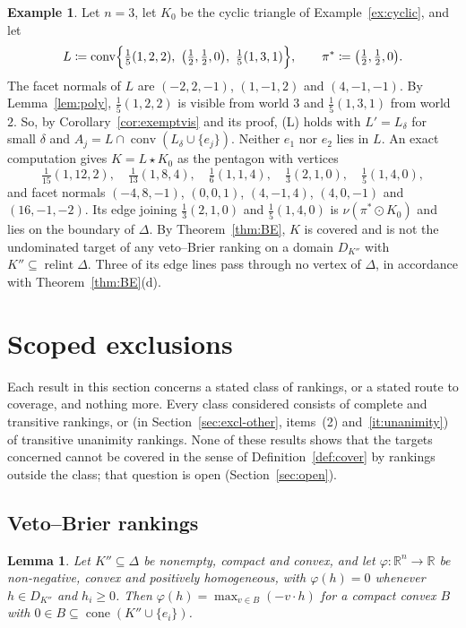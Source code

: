 \documentclass[11pt]{article}
\newcommand{\R}{\mathbb{R}}
\DeclareMathOperator{\conv}{conv}
\DeclareMathOperator{\cone}{cone}
\DeclareMathOperator{\relint}{relint}
\theoremstyle{plain}
\newtheorem{lemma}[theorem]{Lemma}
\theoremstyle{definition}
\newtheorem{example}[theorem]{Example}
\theoremstyle{remark}
\begin{document}
\begin{example}\label{ex:pentagon}
Let $n=3$, let $K_0$ be the cyclic triangle of Example~\ref{ex:cyclic}, and let
\[
  L\coloneqq\conv\Bigl\{\tfrac15(1,2,2),\ \bigl(\tfrac12,\tfrac12,0\bigr),\
  \tfrac15(1,3,1)\Bigr\},\qquad \pi^\ast\coloneqq\bigl(\tfrac12,\tfrac12,0\bigr).
\]
The facet normals of $L$ are $(-2,2,-1)$, $(1,-1,2)$ and $(4,-1,-1)$. By
Lemma~\ref{lem:poly}, $\frac15(1,2,2)$ is visible from world $3$ and $\frac15(1,3,1)$ from
world $2$. So, by Corollary~\ref{cor:exemptvis} and its proof, (L) holds with
$L'=L_\delta$ for small $\delta$ and $A_j=L\cap\conv(L_\delta\cup\{e_j\})$. Neither $e_1$
nor $e_2$ lies in $L$. An exact computation gives $K=L\star K_0$ as the pentagon with
vertices
\[
  \tfrac1{15}(1,12,2),\quad\tfrac1{13}(1,8,4),\quad\tfrac16(1,1,4),\quad
  \tfrac13(2,1,0),\quad\tfrac15(1,4,0),
\]
and facet normals $(-4,8,-1)$, $(0,0,1)$, $(4,-1,4)$, $(4,0,-1)$ and $(16,-1,-2)$. Its
edge joining $\frac13(2,1,0)$ and $\frac15(1,4,0)$ is $\nu(\pi^\ast\odot K_0)$ and lies on
the boundary of $\Delta$. By Theorem~\ref{thm:BE}, $K$ is covered and is not the
undominated target of any veto--Brier ranking on a domain $D_{K''}$ with
$K''\subseteq\relint\Delta$. Three of its edge lines pass through no vertex of $\Delta$, in
accordance with Theorem~\ref{thm:BE}(d).
\end{example}

\section{Scoped exclusions}\label{sec:excl}

Each result in this section concerns a stated class of rankings, or a stated route to
coverage, and nothing more. Every class considered consists of complete and transitive
rankings, or (in Section~\ref{sec:excl-other}, items~(2) and~\ref{it:unanimity}) of
transitive unanimity rankings. None of these results shows that the targets concerned cannot be
covered in the sense of Definition~\ref{def:cover} by rankings outside the class; that
question is open (Section~\ref{sec:open}).

\subsection{Veto--Brier rankings}\label{sec:excl-vb}

\begin{lemma}\label{lem:sublinear}
Let $K''\subseteq\Delta$ be nonempty, compact and convex, and let $\varphi:\R^n\to\R$ be
non-negative, convex and positively homogeneous, with $\varphi(h)=0$ whenever $h\in
D_{K''}$ and $h_i\ge0$. Then $\varphi(h)=\max_{v\in B}(-v\cdot h)$ for a compact convex $B$
with $0\in B\subseteq\cone(K''\cup\{e_i\})$.
\end{lemma}
\end{document}
